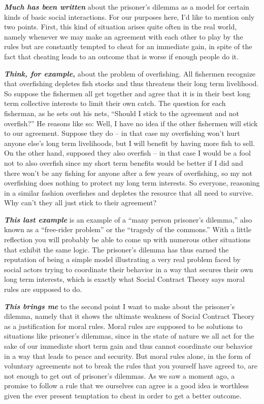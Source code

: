 \documentclass[12pt, openany]{book}
\begin{document}
\textbf{\emph{Much has been written}} about the prisoner's dilemma as a model for certain kinds of basic social interactions. For our purposes here, I'd like to mention only two points. First, this kind of situation arises quite often in the real world, namely whenever we may make an agreement with each other to play by the rules but are constantly tempted to cheat for an immediate gain, in spite of the fact that cheating leads to an outcome that is worse if enough people do it.

\textbf{\emph{Think, for example,}} about the problem of overfishing. All fishermen recognize that overfishing depletes fish stocks and thus threatens their long term livelihood. So suppose the fishermen all get together and agree that it is in their best long term collective interests to limit their own catch. The question for each fisherman, as he sets out his nets, ``Should I stick to the agreement and not overfish?'' He reasons like so: Well, I have no idea if the other fishermen will stick to our agreement. Suppose they do -- in that case my overfishing won't hurt anyone else's long term livelihoods, but I will benefit by having more fish to sell. On the other hand, supposed they also overfish -- in that case I would be a fool not to also overfish since my short term benefits would be better if I did and there won't be any fishing for anyone after a few years of overfishing, so my not overfishing does nothing to protect my long term interests. So everyone, reasoning in a similar fashion overfishes and depletes the resource that all need to survive. Why can't they all just stick to their agreement?

\textbf{\emph{This last example}} is an example of a ``many person prisoner's dilemma,'' also known as a ``free-rider problem'' or the ``tragedy of the commons.'' With a little reflection you will probably be able to come up with numerous other situations that exhibit the same logic. The prisoner's dilemma has thus earned the reputation of being a simple model illustrating a very real problem faced by social actors trying to coordinate their behavior in a way that secures their own long term interests, which is exactly what Social Contract Theory says moral rules are supposed to do.

\textbf{\emph{This brings me}} to the second point I want to make about the prisoner's dilemma, namely that it shows the ultimate weakness of Social Contract Theory as a justification for moral rules. Moral rules are supposed to be solutions to situations like prisoner's dilemmas, since in the state of nature we all act for the sake of our immediate short term gain and thus cannot coordinate our behavior in a way that leads to peace and security. But moral rules alone, in the form of voluntary agreements not to break the rules that you yourself have agreed to, are not enough to get out of prisoner's dilemmas. As we saw a moment ago, a promise to follow a rule that we ourselves can agree is a good idea is worthless given the ever present temptation to cheat in order to get a better outcome.
\end{document}
